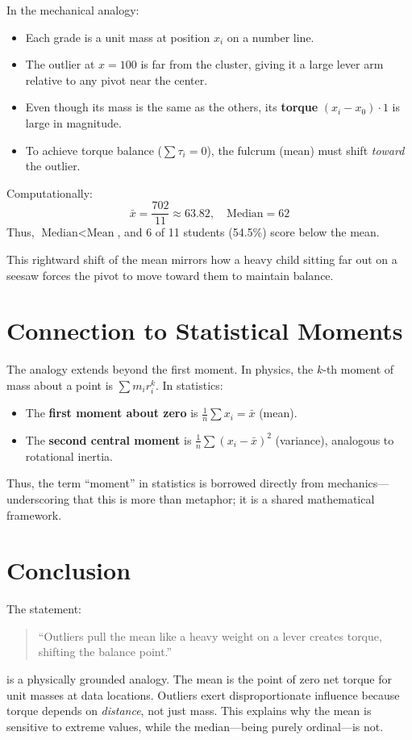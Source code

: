\documentclass{article}
\begin{document}
In the mechanical analogy:
\begin{itemize}
\item Each grade is a unit mass at position $x_i$ on a number line.
    \item The outlier at $x = 100$ is far from the cluster, giving it a large lever arm relative to any pivot near the center.
    \item Even though its mass is the same as the others, its \textbf{torque} $(x_i - x_0) \cdot 1$ is large in magnitude.
    \item To achieve torque balance ($\sum \tau_i = 0$), the fulcrum (mean) must shift \textit{toward} the outlier.
\end{itemize}

Computationally:
\[
\bar{x} = \frac{702}{11} \approx 63.82, \quad \text{Median} = 62
\]
Thus, $\text{Median} < \text{Mean}$, and 6 of 11 students (54.5\%) score below the mean.

This rightward shift of the mean mirrors how a heavy child sitting far out on a seesaw forces the pivot to move toward them to maintain balance.

\section{Connection to Statistical Moments}

The analogy extends beyond the first moment. In physics, the $k$-th moment of mass about a point is $\sum m_i r_i^k$. In statistics:
\begin{itemize}
\item The \textbf{first moment about zero} is $\frac{1}{n}\sum x_i = \bar{x}$ (mean).
    \item The \textbf{second central moment} is $\frac{1}{n}\sum (x_i - \bar{x})^2$ (variance), analogous to rotational inertia.
\end{itemize}

Thus, the term ``moment'' in statistics is borrowed directly from mechanics—underscoring that this is more than metaphor; it is a shared mathematical framework.

\section{Conclusion}

The statement:
\begin{quote}
    ``Outliers pull the mean like a heavy weight on a lever creates torque, shifting the balance point.''
\end{quote}
is a physically grounded analogy. The mean is the point of zero net torque for unit masses at data locations. Outliers exert disproportionate influence because torque depends on \textit{distance}, not just mass. This explains why the mean is sensitive to extreme values, while the median—being purely ordinal—is not.
\end{document}
